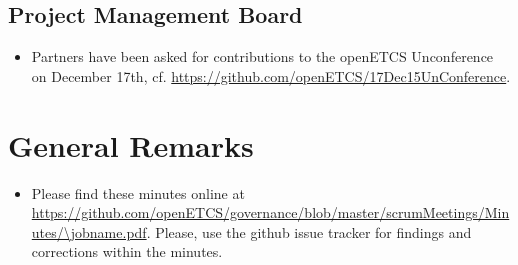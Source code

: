 \documentclass[a4paper, 11pt]{article}
\begin{document}
\subsection{Project Management Board}
\begin{itemize}
\item Partners have been asked for contributions to the openETCS Unconference on December 17th, cf. \url{https://github.com/openETCS/17Dec15UnConference}.
\end{itemize}


\section{General Remarks}

\begin{itemize}
\item Please find these minutes online at \url{https://github.com/openETCS/governance/blob/master/scrumMeetings/Minutes/\jobname.pdf}. Please, use the github issue tracker for findings and corrections within the minutes.
\end{itemize}
\end{document}
